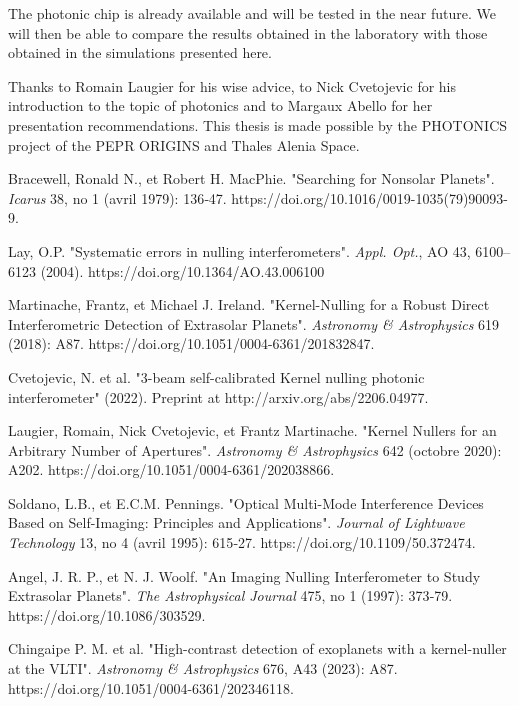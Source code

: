 \documentclass[]{spie}  %
\begin{document}
The photonic chip is already available and will be tested in the near future. We will then be able to compare the results obtained in the laboratory with those obtained in the simulations presented here.

\acknowledgments

Thanks to Romain Laugier for his wise advice, to Nick Cvetojevic for his introduction to the topic of photonics and to Margaux Abello for her presentation recommendations. This thesis is made possible by the PHOTONICS project of the PEPR ORIGINS and Thales Alenia Space.



\begin{thebibliography}{60}

     Bracewell, Ronald N., et Robert H. MacPhie. "Searching for Nonsolar Planets". {\it Icarus} 38, no 1 (avril 1979): 136‑47. https://doi.org/10.1016/0019-1035(79)90093-9.

     Lay, O.P. "Systematic errors in nulling interferometers". {\it Appl. Opt.}, AO 43, 6100–6123 (2004). https://doi.org/10.1364/AO.43.006100

      Martinache, Frantz, et Michael J. Ireland. "Kernel-Nulling for a Robust Direct Interferometric Detection of Extrasolar Planets". {\it Astronomy \& Astrophysics} 619 (2018): A87. https://doi.org/10.1051/0004-6361/201832847.
    
    
     Cvetojevic, N. et al. "3-beam self-calibrated Kernel nulling photonic interferometer" (2022). Preprint at http://arxiv.org/abs/2206.04977.

     Laugier, Romain, Nick Cvetojevic, et Frantz Martinache. "Kernel Nullers for an Arbitrary Number of Apertures". {\it Astronomy \& Astrophysics} 642 (octobre 2020): A202. https://doi.org/10.1051/0004-6361/202038866.

     Soldano, L.B., et E.C.M. Pennings. "Optical Multi-Mode Interference Devices Based on Self-Imaging: Principles and Applications". {\it Journal of Lightwave Technology} 13, no 4 (avril 1995): 615‑27. https://doi.org/10.1109/50.372474.

     Angel, J. R. P., et N. J. Woolf. "An Imaging Nulling Interferometer to Study Extrasolar Planets". {\it The Astrophysical Journal} 475, no 1 (1997): 373‑79. https://doi.org/10.1086/303529.

     Chingaipe P. M. et al. "High-contrast detection of exoplanets with a kernel-nuller at the VLTI". {\it Astronomy \& Astrophysics} 676, A43 (2023): A87. https://doi.org/10.1051/0004-6361/202346118.




\end{thebibliography}
\end{document}
